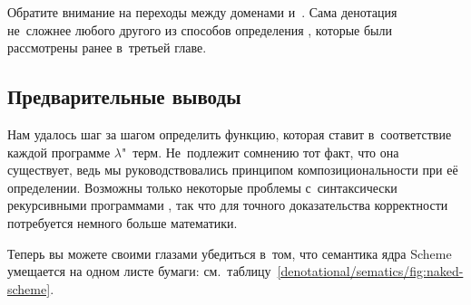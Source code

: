 Обратите внимание на переходы между доменами  и~.
Сама денотация не~сложнее любого другого из способов определения ,
которые были рассмотрены ранее в~третьей главе.


\subsection{Предварительные выводы}%
\label{denotational/sematics/ssect:conclusions}

Нам удалось шаг за шагом определить функцию, которая ставит в~соответствие
каждой программе $\lambda$"~терм. Не~подлежит сомнению тот факт, что она
существует, ведь мы руководствовались принципом композициональности при её
определении. Возможны только некоторые проблемы с~синтаксически рекурсивными
программами \cite{que92a}, так что для точного доказательства корректности
потребуется немного больше математики.

Теперь вы можете своими глазами убедиться в~том, что семантика ядра Scheme
умещается на одном листе бумаги:
см.~таблицу~\ref{denotational/sematics/fig:naked-scheme}.


